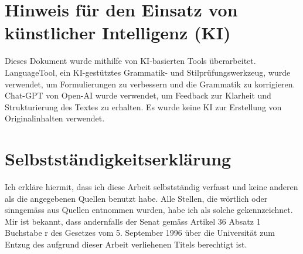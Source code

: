 \documentclass{template}
\begin{document}
\listoffigures
\listoftables


\clearpage
{}




\clearpage



\clearpage



\clearpage



\clearpage



\clearpage



\clearpage



\clearpage


\clearpage
\printglossary[label=sec:glossary]



\clearpage
{}
\printbibliography[heading=bibintoc]

\clearpage

\section*{Hinweis für den Einsatz von künstlicher Intelligenz (KI)}

Dieses Dokument wurde mithilfe von KI-basierten Tools überarbeitet. LanguageTool, ein KI-gestütztes Grammatik- und Stilprüfungswerkzeug, wurde verwendet, um Formulierungen zu verbessern und die Grammatik zu korrigieren. Chat-GPT von Open-AI wurde verwendet, um Feedback zur Klarheit und Strukturierung des Textes zu erhalten. Es wurde keine KI zur Erstellung von Originalinhalten verwendet.


\clearpage

\section*{Selbstständigkeitserklärung}

Ich erkläre hiermit, dass ich diese Arbeit selbstständig verfasst und keine anderen als die angegebenen Quellen benutzt habe. Alle Stellen, die wörtlich oder sinngemäss aus Quellen entnommen wurden, habe ich als solche gekennzeichnet. Mir ist bekannt, dass andernfalls der Senat gemäss Artikel 36 Absatz 1 Buchstabe r des Gesetzes vom 5. September 1996 über die Universität zum Entzug des aufgrund dieser Arbeit verliehenen Titels berechtigt ist.
\end{document}
